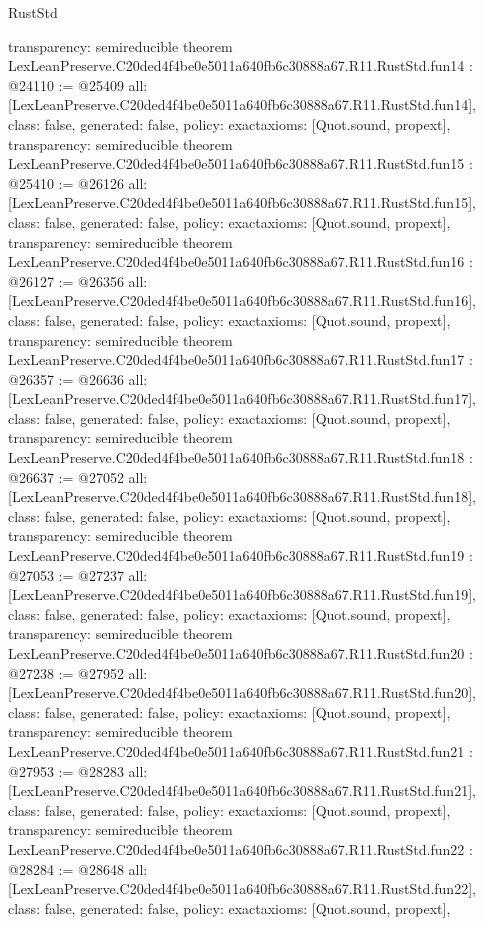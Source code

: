 \begin{lexlean}{RustStd}
\begin{coremodule}
{  transparency: semireducible
}
theorem LexLeanPreserve.C20ded4f4be0e5011a640fb6c30888a67.R11.RustStd.fun14 : @24110 := @25409 {
  all: [LexLeanPreserve.C20ded4f4be0e5011a640fb6c30888a67.R11.RustStd.fun14],
  class: false,
  generated: false,
  policy: exact{axioms: [Quot.sound, propext]},
  transparency: semireducible
}
theorem LexLeanPreserve.C20ded4f4be0e5011a640fb6c30888a67.R11.RustStd.fun15 : @25410 := @26126 {
  all: [LexLeanPreserve.C20ded4f4be0e5011a640fb6c30888a67.R11.RustStd.fun15],
  class: false,
  generated: false,
  policy: exact{axioms: [Quot.sound, propext]},
  transparency: semireducible
}
theorem LexLeanPreserve.C20ded4f4be0e5011a640fb6c30888a67.R11.RustStd.fun16 : @26127 := @26356 {
  all: [LexLeanPreserve.C20ded4f4be0e5011a640fb6c30888a67.R11.RustStd.fun16],
  class: false,
  generated: false,
  policy: exact{axioms: [Quot.sound, propext]},
  transparency: semireducible
}
theorem LexLeanPreserve.C20ded4f4be0e5011a640fb6c30888a67.R11.RustStd.fun17 : @26357 := @26636 {
  all: [LexLeanPreserve.C20ded4f4be0e5011a640fb6c30888a67.R11.RustStd.fun17],
  class: false,
  generated: false,
  policy: exact{axioms: [Quot.sound, propext]},
  transparency: semireducible
}
theorem LexLeanPreserve.C20ded4f4be0e5011a640fb6c30888a67.R11.RustStd.fun18 : @26637 := @27052 {
  all: [LexLeanPreserve.C20ded4f4be0e5011a640fb6c30888a67.R11.RustStd.fun18],
  class: false,
  generated: false,
  policy: exact{axioms: [Quot.sound, propext]},
  transparency: semireducible
}
theorem LexLeanPreserve.C20ded4f4be0e5011a640fb6c30888a67.R11.RustStd.fun19 : @27053 := @27237 {
  all: [LexLeanPreserve.C20ded4f4be0e5011a640fb6c30888a67.R11.RustStd.fun19],
  class: false,
  generated: false,
  policy: exact{axioms: [Quot.sound, propext]},
  transparency: semireducible
}
theorem LexLeanPreserve.C20ded4f4be0e5011a640fb6c30888a67.R11.RustStd.fun20 : @27238 := @27952 {
  all: [LexLeanPreserve.C20ded4f4be0e5011a640fb6c30888a67.R11.RustStd.fun20],
  class: false,
  generated: false,
  policy: exact{axioms: [Quot.sound, propext]},
  transparency: semireducible
}
theorem LexLeanPreserve.C20ded4f4be0e5011a640fb6c30888a67.R11.RustStd.fun21 : @27953 := @28283 {
  all: [LexLeanPreserve.C20ded4f4be0e5011a640fb6c30888a67.R11.RustStd.fun21],
  class: false,
  generated: false,
  policy: exact{axioms: [Quot.sound, propext]},
  transparency: semireducible
}
theorem LexLeanPreserve.C20ded4f4be0e5011a640fb6c30888a67.R11.RustStd.fun22 : @28284 := @28648 {
  all: [LexLeanPreserve.C20ded4f4be0e5011a640fb6c30888a67.R11.RustStd.fun22],
  class: false,
  generated: false,
  policy: exact{axioms: [Quot.sound, propext]},
}
\end{coremodule}
\end{lexlean}
